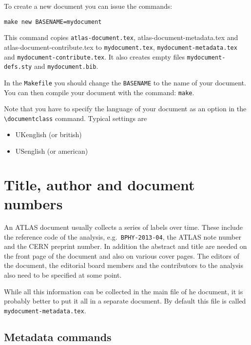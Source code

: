 \documentclass[koma,UKenglish]{style/atlasdoc}
\newcommand{\Macro}[1]{\texttt{\textbackslash #1}\xspace}
\begin{document}
To create a new document you can issue the commands:
%
\begin{verbatim}
make new BASENAME=mydocument
\end{verbatim}
%
This command copies \texttt{atlas-document.tex}, 
{atlas-document-metadata.tex} and {atlas-document-contribute.tex}
to \texttt{mydocument.tex},  \texttt{mydocument-metadata.tex} and
\texttt{mydocument-contribute.tex}.
It also creates empty files \texttt{mydocument-defs.sty} and \texttt{mydocument.bib}.

In the \texttt{Makefile} you should change the \texttt{BASENAME} to the name of your document.
You can then compile your document with the command: \texttt{make}.

Note that you have to specify the language of your document as an option in the
\Macro{documentclass} command. Typical settings are
\begin{itemize}
\item UKenglish (or british)
\item USenglish (or american)
\end{itemize}


\section{Title, author and document numbers}
\label{sec:metadata}

An ATLAS document usually collects a series of labels over time.
These include the reference code of the analysis, e.g.\ \texttt{BPHY-2013-04}, 
the ATLAS note number and the CERN preprint number.
In addition the abstract and title are needed on the front page of the document and also on various cover pages.
The editors of the document, the editorial board members and the contributors to the analysis
also need to be specified at some point.

While all this information can be collected in the main file of he document, 
it is probably better to put it all in a separate document.
By default this file is called \texttt{mydocument-metadata.tex}.

\subsection{Metadata commands}
\end{document}
